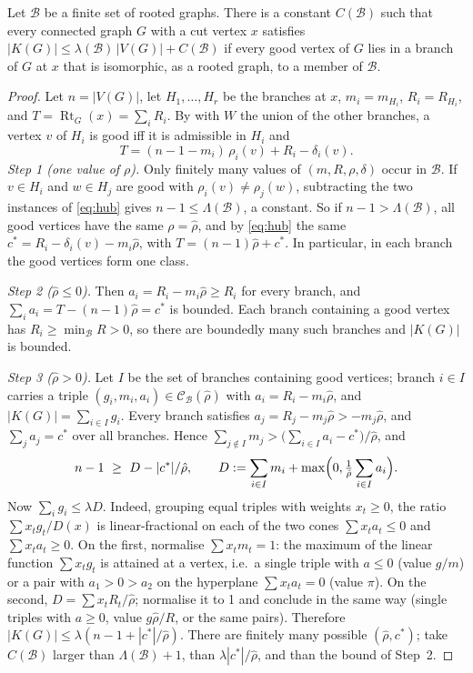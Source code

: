 \documentclass[11pt,a4paper]{report}
\newcommand*{\Rt}{\operatorname{Rt}}
\newcommand*{\cB}{\mathcal{B}}
\newcommand*{\cC}{\mathcal{C}}
\begin{document}
\begin{theorem}\label{thm:barrier}
Let \(\cB\) be a finite set of rooted graphs. There is a constant \(C(\cB)\) such that every connected graph \(G\) with a
cut vertex \(x\) satisfies \(|K(G)|\le\lambda(\cB)\,|V(G)|+C(\cB)\) if every good vertex of \(G\) lies in a branch of
\(G\) at \(x\) that is isomorphic, as a rooted graph, to a member of \(\cB\).
\end{theorem}
\begin{proof}
Let \(n=|V(G)|\), let \(H_1,\dots,H_r\) be the branches at \(x\), \(m_i=m_{H_i}\), \(R_i=R_{H_i}\), and
\(T=\Rt_G(x)=\sum_iR_i\). By  with \(W\) the union of the other branches, a vertex \(v\) of \(H_i\)
is good iff it is admissible in \(H_i\) and
\begin{equation}\label{eq:hub}
T=(n-1-m_i)\,\rho_i(v)+R_i-\delta_i(v).
\end{equation}
\emph{Step 1 (one value of \(\rho\)).} Only finitely many values of \((m,R,\rho,\delta)\) occur in \(\cB\). If \(v\in H_i\)
and \(w\in H_j\) are good with \(\rho_i(v)\neq\rho_j(w)\), subtracting the two instances of \eqref{eq:hub} gives
\(n-1\le\Lambda(\cB)\), a constant. So if \(n-1>\Lambda(\cB)\), all good vertices have the same \(\rho=\hat\rho\), and by
\eqref{eq:hub} the same \(c^*=R_i-\delta_i(v)-m_i\hat\rho\), with \(T=(n-1)\hat\rho+c^*\). In particular, in each branch
the good vertices form one class.

\emph{Step 2 (\(\hat\rho\le0\)).} Then \(a_i=R_i-m_i\hat\rho\ge R_i\) for every branch, and
\(\sum_ia_i=T-(n-1)\hat\rho=c^*\) is bounded. Each branch containing a good vertex has \(R_i\ge\min_{\cB}R>0\), so there
are boundedly many such branches and \(|K(G)|\) is bounded.

\emph{Step 3 (\(\hat\rho>0\)).} Let \(I\) be the set of branches containing good vertices; branch \(i\in I\) carries a
triple \((g_i,m_i,a_i)\in\cC_{\cB}(\hat\rho)\) with \(a_i=R_i-m_i\hat\rho\), and \(|K(G)|=\sum_{i\in I}g_i\). Every
branch satisfies \(a_j=R_j-m_j\hat\rho>-m_j\hat\rho\), and \(\sum_ja_j=c^*\) over all branches. Hence
\(\sum_{j\notin I}m_j>\bigl(\sum_{i\in I}a_i-c^*\bigr)/\hat\rho\), and
\[n-1\ \ge\ D-|c^*|/\hat\rho,\qquad D:=\sum_{i\in I}m_i+\max\Bigl(0,\tfrac1{\hat\rho}\sum_{i\in I}a_i\Bigr).\]
Now \(\sum_ig_i\le\lambda D\). Indeed, grouping equal triples with weights \(x_t\ge0\), the ratio
\(\sum x_tg_t/D(x)\) is linear-fractional on each of the two cones \(\sum x_ta_t\le0\) and \(\sum x_ta_t\ge0\). On the
first, normalise \(\sum x_tm_t=1\): the maximum of the linear function \(\sum x_tg_t\) is attained at a vertex, i.e.\ a
single triple with \(a\le0\) (value \(g/m\)) or a pair with \(a_1>0>a_2\) on the hyperplane \(\sum x_ta_t=0\) (value
\(\pi\)). On the second, \(D=\sum x_tR_t/\hat\rho\); normalise it to 1 and conclude in the same way (single triples with
\(a\ge0\), value \(g\hat\rho/R\), or the same pairs). Therefore
\(|K(G)|\le\lambda(n-1+|c^*|/\hat\rho)\). There are finitely many possible \((\hat\rho,c^*)\); take \(C(\cB)\) larger
than \(\Lambda(\cB)+1\), than \(\lambda|c^*|/\hat\rho\), and than the bound of Step~2.
\end{proof}
\end{document}
